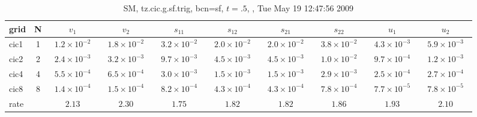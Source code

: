 \begin{table}[hbt]\tableFont %
\begin{center}
\begin{tabular}{|l|c|c|c|c|c|c|c|c|c|} \hline 
grid  & N  & $v_1$ & $v_2$ & $s_{11}$ & $s_{12}$ & $s_{21}$ & $s_{22}$ &  $u_1$ & $u_2$\\ \hline 
                cic1 &     1 & ~$1.2\times10^{ -2}$~ & ~$1.8\times10^{ -2}$~ & ~$3.2\times10^{ -2}$~ & ~$2.0\times10^{ -2}$~ & ~$2.0\times10^{ -2}$~ & ~$3.8\times10^{ -2}$~ & ~$4.3\times10^{ -3}$~ & ~$5.9\times10^{ -3}$~  \\ \hline
                cic2 &     2 & ~$2.4\times10^{ -3}$~ & ~$3.2\times10^{ -3}$~ & ~$9.7\times10^{ -3}$~ & ~$4.5\times10^{ -3}$~ & ~$4.5\times10^{ -3}$~ & ~$1.0\times10^{ -2}$~ & ~$9.7\times10^{ -4}$~ & ~$1.2\times10^{ -3}$~  \\ \hline
                cic4 &     4 & ~$5.5\times10^{ -4}$~ & ~$6.5\times10^{ -4}$~ & ~$3.0\times10^{ -3}$~ & ~$1.5\times10^{ -3}$~ & ~$1.5\times10^{ -3}$~ & ~$2.9\times10^{ -3}$~ & ~$2.5\times10^{ -4}$~ & ~$2.7\times10^{ -4}$~  \\ \hline
                cic8 &     8 & ~$1.4\times10^{ -4}$~ & ~$1.5\times10^{ -4}$~ & ~$8.2\times10^{ -4}$~ & ~$4.3\times10^{ -4}$~ & ~$4.3\times10^{ -4}$~ & ~$7.8\times10^{ -4}$~ & ~$7.7\times10^{ -5}$~ & ~$7.8\times10^{ -5}$~  \\ \hline
    rate             &       &       $2.13$          &       $2.30$          &       $1.75$          &       $1.82$          &       $1.82$          &       $1.86$          &       $1.93$          &       $2.10$           \\ \hline
\end{tabular}
\caption{SM, tz.cic.g.sf.trig, bcn=sf, $t=.5$, , Tue May 19 12:47:56 2009}\label{table:tz.cic.g.sf.trig}
\end{center}
\end{table}
